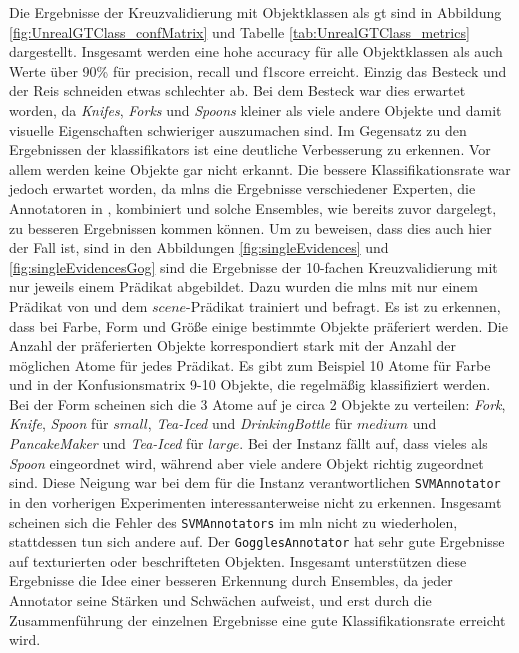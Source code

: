 Die Ergebnisse der Kreuzvalidierung mit Objektklassen als \gls{gt} sind in Abbildung \ref{fig:UnrealGTClass_confMatrix} und Tabelle \ref{tab:UnrealGTClass_metrics} dargestellt. Insgesamt werden eine hohe \gls{accuracy} für alle Objektklassen als auch Werte über 90\% für \gls{precision}, \gls{recall} und \gls{f1score} erreicht. Einzig das Besteck und der Reis schneiden etwas schlechter ab. Bei dem Besteck war dies erwartet worden, da \textit{Knifes}, \textit{Forks} und \textit{Spoons} kleiner  als viele andere Objekte und damit visuelle Eigenschaften schwieriger auszumachen sind. Im Gegensatz zu den Ergebnissen der \glspl{klassifikator} ist eine deutliche Verbesserung zu erkennen. Vor allem werden keine Objekte gar nicht erkannt. Die bessere Klassifikationsrate war jedoch erwartet worden, da \glspl{mln} die Ergebnisse verschiedener Experten, die Annotatoren in \robosherlock, kombiniert und solche Ensembles, wie bereits zuvor dargelegt, zu besseren Ergebnissen kommen können. \newline
Um zu beweisen, dass dies auch hier der Fall ist, sind in den Abbildungen \ref{fig:singleEvidences} und \ref{fig:singleEvidencesGog} sind die Ergebnisse der 10-fachen Kreuzvalidierung mit nur jeweils einem Prädikat abgebildet. Dazu wurden die \glspl{mln} mit nur einem Prädikat von \robosherlock und dem $scene$-Prädikat trainiert und befragt. \newline
Es ist zu erkennen, dass bei Farbe, Form und Größe einige bestimmte Objekte präferiert werden. Die Anzahl der präferierten Objekte korrespondiert stark mit der Anzahl der möglichen Atome für jedes Prädikat. Es gibt zum Beispiel 10 Atome für Farbe und in der Konfusionsmatrix 9-10 Objekte, die regelmäßig klassifiziert werden. Bei der Form scheinen sich die 3 Atome auf je circa 2 Objekte zu verteilen: \textit{Fork}, \textit{Knife}, \textit{Spoon} für $small$, \textit{Tea-Iced} und \textit{DrinkingBottle} für $medium$ und \textit{PancakeMaker} und \textit{Tea-Iced} für $large$. Bei der Instanz fällt auf, dass vieles als \textit{Spoon} eingeordnet wird, während aber viele andere Objekt richtig zugeordnet sind. Diese Neigung war bei dem für die Instanz verantwortlichen \texttt{SVMAnnotator} in den vorherigen Experimenten interessanterweise nicht zu erkennen. Insgesamt scheinen sich die Fehler des \texttt{SVMAnnotators} im \gls{mln} nicht zu wiederholen, stattdessen tun sich andere auf. Der \texttt{GogglesAnnotator} hat sehr gute Ergebnisse auf texturierten oder beschrifteten Objekten. Insgesamt unterstützen diese Ergebnisse die Idee einer besseren Erkennung durch Ensembles, da jeder Annotator seine Stärken und Schwächen aufweist, und erst durch die Zusammenführung der einzelnen Ergebnisse eine gute Klassifikationsrate erreicht wird.\par

